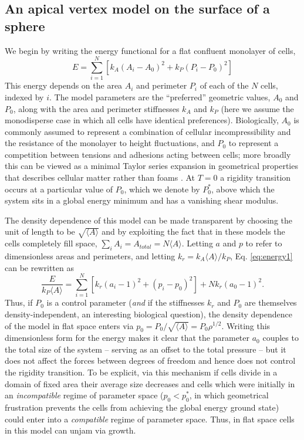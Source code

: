 \documentclass[aps,pre,reprint,superscriptaddress,nofootinbib]{revtex4-2}
\begin{document}
\subsection{An apical vertex model on the surface of a sphere}
We begin by writing  the energy functional for a flat confluent monolayer of cells,
\begin{equation}
\label{eq:energy1}
E = \sum_{i=1}^{N}{\left[k_A\left(A_i - A_0\right)^2 +k_P \left(P_i-P_0\right)^2\right]}
\end{equation}
This energy depends on the area $A_i$ and perimeter $P_i$ of each of the $N$ cells, indexed by $i$. The model parameters are the ``preferred'' geometric values, $A_0$ and $P_0$, along with the area and perimeter stiffnesses $k_A$ and $k_P$ (here we assume the monodisperse case in which all cells have identical preferences). Biologically, $A_0$ is commonly assumed to represent a combination of cellular incompressibility and the resistance of the monolayer to height fluctuations, and $P_0$ to represent a competition between tensions and adhesions acting between cells; more broadly this can be viewed as a minimal Taylor series expansion in geometrical properties that describes cellular matter rather than foams \cite{kim2018universal}. At $T=0$ a rigidity transition occurs at a particular value of $P_0$, which we denote by $P_0^*$, above which the system sits in a global energy minimum and has a vanishing shear modulus.

The density dependence of this model can be made transparent \cite{teomy2018confluent,merkel2018geometrically} by choosing the unit of length to be $\sqrt{\langle A \rangle}$ and by exploiting the fact that in these models the cells completely fill space, $\sum_i A_i = A_{total} = N\langle A \rangle$. Letting $a$ and $p$ to refer to dimensionless areas and perimeters, and letting $k_r = k_A \langle A \rangle / k_P$, Eq. \ref{eq:energy1} can be rewritten as
\begin{equation}
\label{eq:energy2}
\frac{E}{k_P\langle A \rangle } = \sum_{i=1}^{N}{\left[k_r\left(a_i - 1\right)^2 +\left(p_i-p_0\right)^2\right]} + N k_r \left(a_0-1\right)^2.\nonumber
\end{equation}
Thus, if $P_0$ is a control parameter (\emph{and} if the stiffnesses $k_r$ and $P_0$ are themselves density-independent, an interesting biological question), the density dependence of the model in flat space enters via $p_0 = P_0/\sqrt{\langle A \rangle} = P_0 \rho^{1/2}$. Writing this dimensionless form for the energy makes it clear that the parameter $a_0$ couples to the total size of the system -- serving as an offset to the total pressure -- but it does not affect the forces between degrees of freedom \cite{teomy2018confluent,merkel2018geometrically} and hence does not control the rigidity transition. To be explicit, via this mechanism if cells divide in a domain of fixed area their average size decreases and cells which were initially in an \emph{incompatible} regime of parameter space ($p_0 < p_0^*$, in which geometrical frustration prevents the cells from achieving the global energy ground state) could enter into a \emph{compatible} regime of parameter space. Thus, in flat space cells in this model can unjam via growth.
\end{document}
